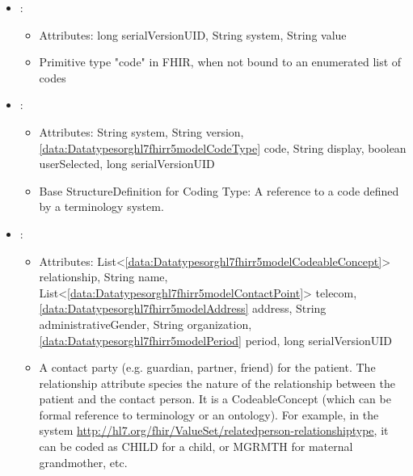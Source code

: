 \begin{itemize}[nolistsep,noitemsep]
\item {}: 
\begin{itemize}[noitemsep,nolistsep]
\item[] Attributes: long serialVersionUID, String system, String value
\item[] Primitive type "code" in FHIR, when not bound to an enumerated list of codes
\end{itemize}

\item {}: 
\begin{itemize}[noitemsep,nolistsep]
\item[] Attributes: String system, String version, \ref{data:Datatypesorghl7fhirr5modelCodeType} code, String display, boolean userSelected, long serialVersionUID
\item[] Base StructureDefinition for Coding Type: A reference to a code defined by a terminology system.
\end{itemize}

\item {}: 
\begin{itemize}[noitemsep,nolistsep]
\item[] Attributes: List\textless{}\ref{data:Datatypesorghl7fhirr5modelCodeableConcept}\textgreater{} relationship, String name, List\textless{}\ref{data:Datatypesorghl7fhirr5modelContactPoint}\textgreater{} telecom, \ref{data:Datatypesorghl7fhirr5modelAddress} address, String administrativeGender, String organization, \ref{data:Datatypesorghl7fhirr5modelPeriod} period, long serialVersionUID
\item[] A contact party (e.g. guardian, partner, friend) for the patient.
The relationship attribute species the nature of the relationship between the patient and the contact person.
It is a CodeableConcept (which can be formal reference to terminology or an ontology).
For example, in the system \url{http://hl7.org/fhir/ValueSet/relatedperson-relationshiptype}, it can be coded as CHILD for a child, or MGRMTH for maternal grandmother, etc.
\end{itemize}


\end{itemize}
